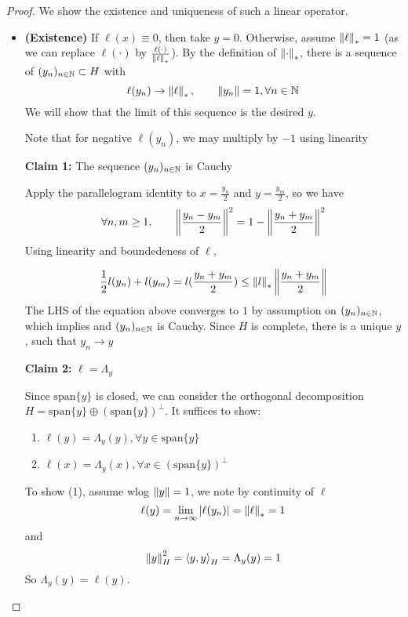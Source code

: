 \documentclass{article}
\begin{document}
\begin{proof}
	We show the existence and uniqueness of such a linear operator.
	\begin{itemize}
		\item \textbf{(Existence)} If  \(\ell(x)\equiv 0\), then take  \(y=0\). Otherwise, assume  \(\left\|{\ell}\right\|_*=1\) (as we can replace  \(\ell(\cdot)\) by  \(\frac{\ell(\cdot)}{\left\|{\ell}\right\|_*}\)).
		      By the definition of  \(\left\|{\cdot}\right\|_*\), there is a sequence of  \((y_n)_{n\in \mathbb{N}} \subset H\) with
		      \begin{equation*}
			      \ell(y_n) \to \left\|{\ell}\right\|_*, \qquad \left\|{y_n}\right\|=1, \forall n \in \mathbb{N}
		      \end{equation*}
		      We will show that the limit of this sequence is the desired  \(y\).
		      \begin{unexaminable}
			      Note that for negative $\ell(y_n)$, we may multiply by $-1$ using linearity
		      \end{unexaminable}

		      \textbf{Claim 1:} The sequence  \((y_n)_{n \in \mathbb{N}}\) is Cauchy

		      Apply the parallelogram identity to  \(x = \frac{y_n}{2}\) and  \(y = \frac{y_m}{2}\), so we have
		      \begin{equation*}
			      \forall n,m \geq 1, \qquad \left\|{\frac{y_n-y_m}{2}}\right\|^2=1-\left\|{\frac{y_n+y_m}{2}}\right\|^2
		      \end{equation*}
		      Using linearity and boundedeness of  \(\ell\),

		      \begin{equation*}
			      \frac{1}{2} l(y_n)+l(y_m) = l(\frac{y_n+y_m}{2}) \leq \left\|{l}\right\|_* \left\|{\frac{y_n+y_m}{2}}\right\|
		      \end{equation*}
		      The LHS of the equation above converges to  \(1\) by assumption on  \((y_n)_{n \in \mathbb{N}}\), which implies and  \((y_n)_{n \in \mathbb{N}}\) is Cauchy.
		      Since  \(H\) is complete, there is a unique  \(y\), such that  \(y_n \to y\)

		      \textbf{Claim 2:}  \(\ell=\Lambda_y\)

		      Since  \(\textrm{span}\{y\}\) is closed, we can consider the orthogonal decomposition  \(H = \textrm{span}\{y\} \oplus (\textrm{span}\{y\})^{\perp}\).
		      It suffices to show:
		      \begin{enumerate}[(1)]
			      \item  \(\ell(y)=\Lambda_y(y), \forall y \in \textrm{span}\{y\}\)
			      \item  \(\ell(x)=\Lambda_y(x), \forall x \in (\textrm{span}\{y\})^{\perp}\)
		      \end{enumerate}
		      To show (1), assume wlog  \(\left\|{y}\right\|=1\), we note by continuity of  \(\ell\)
		      \begin{equation*}
			      \ell(y) = \lim_{n \to \infty} |\ell(y_n)| = \left\|{\ell}\right\|_*=1
		      \end{equation*}
		      and
		      \begin{equation*}
			      \left\|{y}\right\|^2_H = \left<{y},{y}\right>_H =\Lambda_y(y)=1
		      \end{equation*}
		      So  \(\Lambda_y(y)=\ell(y)\).


\end{itemize}
\end{proof}
\end{document}
